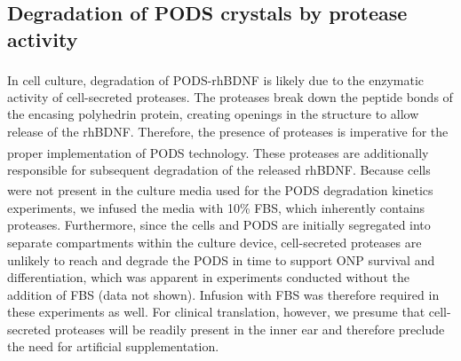 \documentclass[review]{elsarticle}
\begin{document}
\subsection{Degradation of PODS\textsuperscript{\textregistered} crystals by protease activity}
In cell culture, degradation of PODS\textsuperscript{\textregistered}-rhBDNF is likely due to the enzymatic activity of cell-secreted proteases. The proteases break down the peptide bonds of the encasing polyhedrin protein, creating openings in the structure to allow release of the rhBDNF. Therefore, the presence of proteases is imperative for the proper implementation of PODS\textsuperscript{\textregistered} technology. These proteases are additionally responsible for subsequent degradation of the released rhBDNF. Because cells were not present in the culture media used for the PODS\textsuperscript{\textregistered} degradation kinetics experiments, we infused the media with 10\% FBS, which inherently contains proteases. Furthermore, since the cells and PODS are initially segregated into separate compartments within the culture device, cell-secreted proteases are unlikely to reach and degrade the PODS in time to support ONP survival and differentiation, which was apparent in experiments conducted without the addition of FBS (data not shown). Infusion with FBS was therefore required in these experiments as well. For clinical translation, however, we presume that cell-secreted proteases will be readily present in the inner ear and therefore preclude the need for artificial supplementation.
\end{document}
